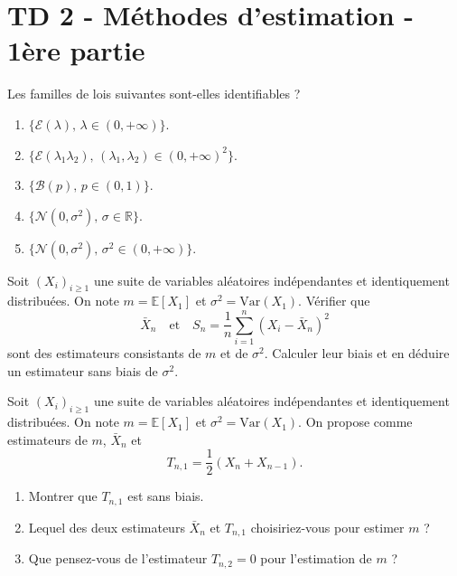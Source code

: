 \chapter*{TD 2 - Méthodes d'estimation - 1ère partie}

\setcounter{exercice}{0}

\begin{mdframed}
\begin{exercice}
Les familles de lois suivantes sont-elles identifiables ?
\begin{enumerate}
    \item $\{\mathcal{E}(\lambda), \, \lambda \in (0, +\infty)\}$.
    \item $\{\mathcal{E}(\lambda_1 \lambda_2), \, (\lambda_1, \lambda_2) \in (0, +\infty)^2\}$.
    \item $\{\mathcal{B}(p), \, p \in (0, 1)\}$.
    \item $\{\mathcal{N}(0, \sigma^2), \, \sigma \in \mathbb{R}\}$.
    \item $\{\mathcal{N}(0, \sigma^2), \, \sigma^2 \in (0, +\infty)\}$.
\end{enumerate}
\end{exercice}
\end{mdframed}

\smallskip

\begin{mdframed}
\begin{exercice}
Soit $(X_i)_{i \ge 1}$ une suite de variables aléatoires indépendantes et identiquement distribuées. On note $m = \mathbb{E}[X_1]$ et $\sigma^2 = \text{Var}(X_1)$. Vérifier que
\begin{equation*}
\bar{X}_n \quad \text{et} \quad S_n = \frac{1}{n} \sum_{i=1}^n (X_i - \bar{X}_n)^2
\end{equation*}
sont des estimateurs consistants de $m$ et de $\sigma^2$. Calculer leur biais et en déduire un estimateur sans biais de $\sigma^2$.
\end{exercice}
\end{mdframed}

\smallskip

\begin{mdframed}
\begin{exercice}
Soit $(X_i)_{i \ge 1}$ une suite de variables aléatoires indépendantes et identiquement distribuées. On note $m = \mathbb{E}[X_1]$ et $\sigma^2 = \text{Var}(X_1)$. On propose comme estimateurs de $m$, $\bar{X}_n$ et
\begin{equation*}
T_{n,1} = \frac{1}{2}(X_n + X_{n-1}).
\end{equation*}

\begin{enumerate}
    \item Montrer que $T_{n,1}$ est sans biais.
    \item Lequel des deux estimateurs $\bar{X}_n$ et $T_{n,1}$ choisiriez-vous pour estimer $m$ ?
    \item Que pensez-vous de l'estimateur $T_{n,2} = 0$ pour l'estimation de $m$ ?
\end{enumerate}
\end{exercice}
\end{mdframed}

